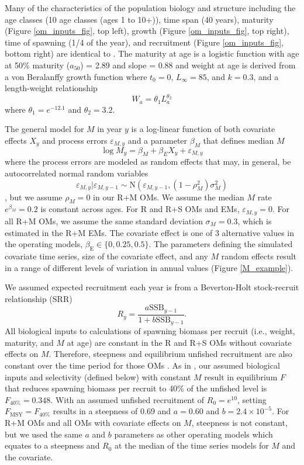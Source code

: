 \documentclass[
  12pt,
]{article}
\newcommand{\Fmsy}{\ensuremath{F_{\text{MSY}}}\xspace}
\begin{document}
Many of the characteristics of the population biology and structure including the age classes (10 age classes (ages 1 to 10+)), time span (40 years), maturity (Figure \ref{om_inputs_fig}, top left), growth (Figure \ref{om_inputs_fig}, top right), time of spawning (1/4 of the year), and recruitment (Figure \ref{om_inputs_fig}, bottom right) are identical to \citet{milleretal_inreview1}. The maturity at age is a logistic function with age at 50\% maturity (\(a_{50}\)) = 2.89 and slope = 0.88 and weight at age is derived from a von Beralanffy growth function where \(t_0 = 0\), \(L_\infty = 85\), and \(k = 0.3\), and a length-weight relationship
\[
W_a = \theta_1 L_a^{\theta_2}
\]
where \(\theta_1 = e^{-12.1}\) and \(\theta_2 = 3.2\).

The general model for \(M\) in year \(y\) is a log-linear function of both covariate effects \(X_y\) and process errors \(\varepsilon_{M,y}\) and a parameter \(\beta_{M}\) that defines median \(M\)
\[
\log M_y = \beta_M + \beta_{E} X_y + \varepsilon_{M,y}
\]
where the process errors are modeled as random effects that may, in general, be autocorrelated normal random variables
\[
\varepsilon_{M,y}|\varepsilon_{M,y-1} \sim \text{N}\left(\varepsilon_{M,y-1},(1-\rho_M^2)\sigma_M^2\right)
\]
\citep{stockmiller21}, but we assume \(\rho_M = 0\) in our R+M OMs. We assume the median \(M\) rate \(e^{\beta_M} = 0.2\) is constant across ages. For R and R+S OMs and EMs, \(\varepsilon_{M,y} = 0\). For all R+M OMs, we assume the same standard deviation \(\sigma_M = 0.3\), which is estimated in the R+M EMs. The covariate effect is one of 3 alternative values in the operating models, \(\beta_\text{E} \in \{0,0.25,0.5\}\). The parameters defining the simulated covariate time series, size of the covariate effect, and any \(M\) random effects result in a range of different levels of variation in annual values (Figure \ref{M_example}).

We assumed expected recruitment each year is from a Beverton-Holt stock-recruit relationship (SRR)
\[
R_{y} = \frac{a \text{SSB}_{y-1}}{1 + b \text{SSB}_{y-1}}.
\]
All biological inputs to calculations of spawning biomass per recruit (i.e., weight, maturity, and \(M\) at age) are constant in the R and R+S OMs without covariate effects on \(M\). Therefore, steepness and equilibrium unfished recruitment are also constant over the time period for those OMs \citep{millerbrooks21}. As in \citet{milleretal_inreview1}, our assumed biological inputs and selectivity (defined below) with constant \(M\) result in equilibrium \(F\) that reduces spawning biomass per recruit to 40\% of the unfished level is \(F_{40\%} = 0.348\). With an assumed unfished recruitment of \(R_0 = e^{10}\), setting \(\Fmsy = F_{40\%}\) results in a steepness of 0.69 and \(a=0.60\) and \(b = 2.4 \times 10^{-5}\). For R+M OMs and all OMs with covariate effects on \(M\), steepness is not constant, but we used the same \(a\) and \(b\) parameters as other operating models which equates to a steepness and \(R_0\) at the median of the time series models for \(M\) and the covariate.
\end{document}
